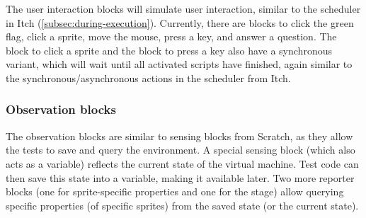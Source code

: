 \documentclass[../main]{subfiles}
\begin{document}
\begin{varwidth}{0.5\linewidth}
    \begin{scratch}[scale=0.6]
    \end{scratch}
\end{varwidth}%
\hspace{1em}%
\begin{varwidth}{0.5\linewidth}
    \begin{scratch}[scale=0.6]
    \end{scratch}
\end{varwidth}%

The user interaction blocks will simulate user interaction, similar to the scheduler in Itch (\cref{subsec:during-execution}).
Currently, there are blocks to click the green flag, click a sprite, move the mouse, press a key, and answer a question.
The block to click a sprite and the block to press a key also have a synchronous variant, which will wait until all activated scripts have finished, again similar to the synchronous/asynchronous actions in the scheduler from Itch.

\subsubsection{Observation blocks}

\begin{varwidth}{0.2\linewidth}
\end{varwidth}%
\hspace{1em}%
\begin{varwidth}{0.5\linewidth}
\end{varwidth}%
\hspace{1em}%
\begin{varwidth}{0.3\linewidth}
\end{varwidth}

The observation blocks are similar to sensing blocks from Scratch, as they allow the tests to save and query the environment.
A special sensing block (which also acts as a variable) reflects the current state of the virtual machine.
Test code can then save this state into a variable, making it available later.
Two more reporter blocks (one for sprite-specific properties and one for the stage) allow querying specific properties (of specific sprites) from the saved state (or the current state).
\end{document}
